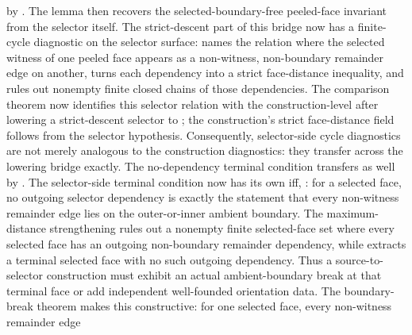 \documentclass[11pt]{article}
\begin{document}
\begin{itemize}
 by
.
The lemma
then recovers the selected-boundary-free peeled-face invariant from the
selector itself.  The strict-descent part of this bridge now has a finite-cycle
diagnostic on the selector surface:
 names the relation
where the selected witness of one peeled face appears as a non-witness,
non-boundary remainder edge on another,
turns each dependency into a strict face-distance inequality, and
rules out nonempty finite closed chains of those dependencies.  The comparison
theorem
now identifies this selector relation with the construction-level
 after lowering a
strict-descent selector to ; the
construction's strict face-distance field follows from the selector 
hypothesis.  Consequently, selector-side cycle diagnostics are not merely
analogous to the construction diagnostics: they transfer across the lowering
bridge exactly.  The no-dependency terminal condition transfers as well by
.
The selector-side terminal condition now has its own iff,
:
for a selected face, no outgoing selector dependency is exactly the statement
that every non-witness remainder edge lies on the outer-or-inner ambient
boundary.  The maximum-distance
strengthening
rules out a nonempty finite selected-face set where every selected face has an
outgoing non-boundary remainder dependency, while
extracts a terminal selected face with no such outgoing dependency.  Thus a
source-to-selector construction must exhibit an actual ambient-boundary break at
that terminal face or add independent well-founded orientation data.  The
boundary-break theorem
makes this constructive: for one selected face, every non-witness remainder edge

\end{itemize}
\end{document}
